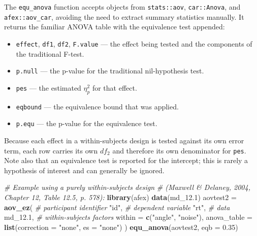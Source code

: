 \documentclass[]{interact}
\theoremstyle{plain}%
\theoremstyle{definition}
\theoremstyle{remark}
\newenvironment{Shaded}{\begin{snugshade}}{\end{snugshade}}
\newcommand{\AttributeTok}[1]{\textcolor[rgb]{0.13,0.29,0.53}{#1}}
\newcommand{\CommentTok}[1]{\textcolor[rgb]{0.56,0.35,0.01}{\textit{#1}}}
\newcommand{\FloatTok}[1]{\textcolor[rgb]{0.00,0.00,0.81}{#1}}
\newcommand{\FunctionTok}[1]{\textcolor[rgb]{0.13,0.29,0.53}{\textbf{#1}}}
\newcommand{\NormalTok}[1]{#1}
\newcommand{\OtherTok}[1]{\textcolor[rgb]{0.56,0.35,0.01}{#1}}
\newcommand{\StringTok}[1]{\textcolor[rgb]{0.31,0.60,0.02}{#1}}
\providecommand{\tightlist}{%
  \setlength{\itemsep}{0pt}\setlength{\parskip}{0pt}}
\def\tightlist{}
\begin{document}
The \texttt{equ\_anova} function accepts objects from
\texttt{stats::aov}, \texttt{car::Anova}, and \texttt{afex::aov\_car},
avoiding the need to extract summary statistics manually. It returns the
familiar ANOVA table with the equivalence test appended:

\begin{itemize}
\tightlist
\item
  \texttt{effect}, \texttt{df1}, \texttt{df2}, \texttt{F.value} --- the
  effect being tested and the components of the traditional F-test.
\item
  \texttt{p.null} --- the p-value for the traditional nil-hypothesis
  test.
\item
  \texttt{pes} --- the estimated \(\eta^2_p\) for that effect.
\item
  \texttt{eqbound} --- the equivalence bound that was applied.
\item
  \texttt{p.equ} --- the p-value for the equivalence test.
\end{itemize}

Because each effect in a within-subjects design is tested against its
own error term, each row carries its own \(df_2\) and therefore its own
denominator for \texttt{pes}. Note also that an equivalence test is
reported for the intercept; this is rarely a hypothesis of interest and
can generally be ignored.

\begin{Shaded}
\begin{Highlighting}[]
\CommentTok{\# Example using a purely within{-}subjects design}
\CommentTok{\# (Maxwell \& Delaney, 2004, Chapter 12, Table 12.5, p. 578):}
\FunctionTok{library}\NormalTok{(afex)}
\FunctionTok{data}\NormalTok{(md\_12}\FloatTok{.1}\NormalTok{)}
\NormalTok{aovtest2 }\OtherTok{=} \FunctionTok{aov\_ez}\NormalTok{(}
  \CommentTok{\# participant identifier}
  \StringTok{"id"}\NormalTok{,}
  \CommentTok{\# dependent variable}
  \StringTok{"rt"}\NormalTok{,}
  \CommentTok{\# data}
\NormalTok{  md\_12}\FloatTok{.1}\NormalTok{,}
  \CommentTok{\# within{-}subjects factors}
  \AttributeTok{within =} \FunctionTok{c}\NormalTok{(}\StringTok{"angle"}\NormalTok{, }\StringTok{"noise"}\NormalTok{),}
  \AttributeTok{anova\_table =} \FunctionTok{list}\NormalTok{(}\AttributeTok{correction =} \StringTok{"none"}\NormalTok{, }\AttributeTok{es =} \StringTok{"none"}\NormalTok{)}
\NormalTok{)}
\FunctionTok{equ\_anova}\NormalTok{(aovtest2, }\AttributeTok{eqb =} \FloatTok{0.35}\NormalTok{)}
\end{Highlighting}
\end{Shaded}
\end{document}
